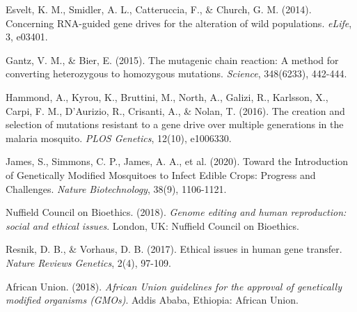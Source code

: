 \documentclass[12pt]{article}
\begin{document}
\begin{thebibliography}{}

Esvelt, K. M., Smidler, A. L., Catteruccia, F., \& Church, G. M. (2014). Concerning RNA-guided gene drives for the alteration of wild populations. \textit{eLife}, 3, e03401.

Gantz, V. M., \& Bier, E. (2015). The mutagenic chain reaction: A method for converting heterozygous to homozygous mutations. \textit{Science}, 348(6233), 442-444.

Hammond, A., Kyrou, K., Bruttini, M., North, A., Galizi, R., Karlsson, X., Carpi, F. M., D'Aurizio, R., Crisanti, A., \& Nolan, T. (2016). The creation and selection of mutations resistant to a gene drive over multiple generations in the malaria mosquito. \textit{PLOS Genetics}, 12(10), e1006330.

James, S., Simmons, C. P., James, A. A., et al. (2020). Toward the Introduction of Genetically Modified Mosquitoes to Infect Edible Crops: Progress and Challenges. \textit{Nature Biotechnology}, 38(9), 1106-1121.

Nuffield Council on Bioethics. (2018). \textit{Genome editing and human reproduction: social and ethical issues}. London, UK: Nuffield Council on Bioethics.

Resnik, D. B., \& Vorhaus, D. B. (2017). Ethical issues in human gene transfer. \textit{Nature Reviews Genetics}, 2(4), 97-109.

African Union. (2018). \textit{African Union guidelines for the approval of genetically modified organisms (GMOs)}. Addis Ababa, Ethiopia: African Union.

\end{thebibliography}
\end{document}
